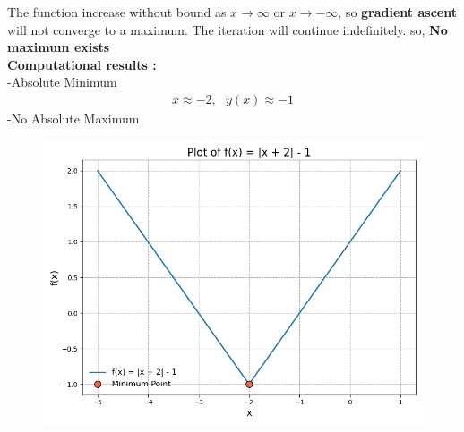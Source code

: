 \documentclass[journal]{IEEEtran}
\begin{document}
The function increase without bound as $x \rightarrow \infty$ or $x \rightarrow -\infty$, so \textbf{gradient ascent} will not converge to a maximum. The iteration will continue indefinitely.
so, \textbf{No maximum exists}\\

\textbf{Computational results :}\\
-Absolute Minimum
\begin{align}
    x \approx -2 , \text{ } y(x) \approx -1  
\end{align}
-No Absolute Maximum\\

 \begin{figure}[ht!]
   \centering
   \includegraphics[width=\columnwidth]{figs/Figure_1.png}
\end{figure}
\end{document}

